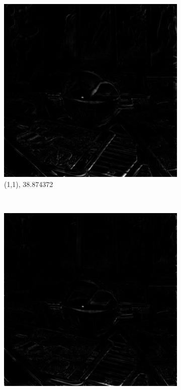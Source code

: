 \documentclass[11pt,a4paper,titlepage]{article}
\begin{document}
\begin{figure}
	\centering
	\begin{subfigure}[t]{0.3\textwidth}
		\includegraphics[width=\textwidth]{results/tile_blending/tarot6x6x512x512-512x512x5-sampling=2x_tileRes=200x200_overlap=0.5/MSE_for_view_(1,1).png}
		\caption{(1,1), 38.874372}
	\end{subfigure}%
	~
	\begin{subfigure}[t]{0.3\textwidth}
		\includegraphics[width=\textwidth]{results/tile_blending/tarot6x6x512x512-512x512x5-sampling=2x_tileRes=200x200_overlap=0.5/MSE_for_view_(1,3).png}

\end{subfigure}
\end{figure}
\end{document}
